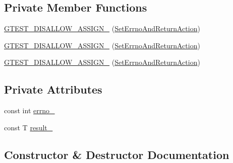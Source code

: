 \subsection*{Private Member Functions}
\begin{DoxyCompactItemize}
\item 
\mbox{\hyperlink{classtesting_1_1internal_1_1_set_errno_and_return_action_a18906b36848b148a809907d105823ccc}{G\+T\+E\+S\+T\+\_\+\+D\+I\+S\+A\+L\+L\+O\+W\+\_\+\+A\+S\+S\+I\+G\+N\+\_\+}} (\mbox{\hyperlink{classtesting_1_1internal_1_1_set_errno_and_return_action}{Set\+Errno\+And\+Return\+Action}})
\item 
\mbox{\hyperlink{classtesting_1_1internal_1_1_set_errno_and_return_action_a18906b36848b148a809907d105823ccc}{G\+T\+E\+S\+T\+\_\+\+D\+I\+S\+A\+L\+L\+O\+W\+\_\+\+A\+S\+S\+I\+G\+N\+\_\+}} (\mbox{\hyperlink{classtesting_1_1internal_1_1_set_errno_and_return_action}{Set\+Errno\+And\+Return\+Action}})
\item 
\mbox{\hyperlink{classtesting_1_1internal_1_1_set_errno_and_return_action_a18906b36848b148a809907d105823ccc}{G\+T\+E\+S\+T\+\_\+\+D\+I\+S\+A\+L\+L\+O\+W\+\_\+\+A\+S\+S\+I\+G\+N\+\_\+}} (\mbox{\hyperlink{classtesting_1_1internal_1_1_set_errno_and_return_action}{Set\+Errno\+And\+Return\+Action}})
\end{DoxyCompactItemize}
\subsection*{Private Attributes}
\begin{DoxyCompactItemize}
\item 
const int \mbox{\hyperlink{classtesting_1_1internal_1_1_set_errno_and_return_action_ac4f5ce108de323f1f76654c38aa883a3}{errno\+\_\+}}
\item 
const T \mbox{\hyperlink{classtesting_1_1internal_1_1_set_errno_and_return_action_a271f5a3b41aa3a7f06fbd69ad19b1c77}{result\+\_\+}}
\end{DoxyCompactItemize}


\subsection{Constructor \& Destructor Documentation}
\mbox{\label{classtesting_1_1internal_1_1_set_errno_and_return_action_abfe5a194a9b8f2b303c635ad99b3a257}} 
